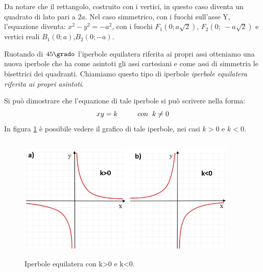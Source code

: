 \vspace{12pt}
Da notare che il rettangolo, costruito con i vertici, in questo caso diventa un quadrato di lato pari a $2a$.
Nel caso simmetrico, con i fuochi sull'asse Y, l'equazione diventa:
$ x^{2} - y^{2} =- a^{2} $, con i fuochi 
$ F_{1} \left(0; a \sqrt{2}\right)$, $ F_{2} \left(0;~-a \sqrt{2}\right)$ 
e vertici reali $ B_{1} (0; a)$,$ B_{2} (0; -a)$.

\vspace{7pt}

Ruotando di $45\grado$ l'iperbole equilatera riferita ai propri 
assi otteniamo una nuova iperbole che ha come asintoti gli assi cartesiani 
e come assi di simmetria le bisettrici dei quadranti.
Chiamiamo questo tipo 
di iperbole \emph{iperbole equilatera riferita ai propri asintoti}.

Si può dimostrare che l'equazione di tale iperbole si può scrivere nella 
forma: 
\begin{equation}
x y=k \hspace{1cm} con \hspace{0.2cm}k \neq 0
\end{equation}
In figura \ref{fig:iperboleequilatera} è possibile vedere il grafico di tale iperbole, nei casi $k>0$ e $k<0$.
\begin{figure}[!h]
  \centering
  \includegraphics[height=6cm, width=10.5cm]{img/equilatera2.jpg}
  \caption{Iperbole equilatera con k>0 e k<0.}
  \label{fig:iperboleequilatera}
\end{figure}

\vspace{7pt}

